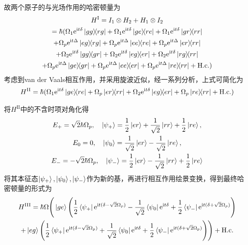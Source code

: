 \documentclass[fontset=windows,toc=true,type=bachelor,stage=opening,campus=weihai]{hithesisart}
\begin{document}
\begin{enumerate}
故两个原子的与光场作用的哈密顿量为
\begin{multline}
H^\mathrm{I}=I_1\otimes H_2+H_1\otimes I_2\\
=\hbar(\Omega_1\mathrm{e}^{\mathrm{i}t\delta}\ketbra{gg}{rg}
+\Omega_1\mathrm{e}^{\mathrm{i}t\delta}\ketbra{ge}{re}
+\Omega_1\mathrm{e}^{\mathrm{i}t\delta}\ketbra{gr}{rr}\\
+\Omega_p\mathrm{e}^{\mathrm{i}t\Delta}\ketbra{eg}{rg}
+\Omega_p\mathrm{e}^{\mathrm{i}t\Delta}\ketbra{ee}{re}
+\Omega_p\mathrm{e}^{\mathrm{i}t\Delta}\ketbra{er}{rr}\\
+\Omega_2\mathrm{e}^{\mathrm{i}t\delta}\ketbra{gg}{gr}
+\Omega_2\mathrm{e}^{\mathrm{i}t\delta}\ketbra{eg}{er}
+\Omega_2\mathrm{e}^{\mathrm{i}t\delta}\ketbra{rg}{rr}\\
+\Omega_p\mathrm{e}^{\mathrm{i}t\Delta}\ketbra{ge}{gr}
+\Omega_p\mathrm{e}^{\mathrm{i}t\Delta}\ketbra{ee}{er}
+\Omega_p\mathrm{e}^{\mathrm{i}t\Delta}\ketbra{re}{rr}
+\mathrm{H.c.})
\end{multline}
考虑到van der Vaals相互作用，并采用旋波近似，经一系列分析，上式可简化为
\begin{equation}
H^{\mathrm{II}}=\hbar(\Omega_1\mathrm{e}^{\mathrm{i}t \delta}\ketbra{ge}{re}
+\Omega_p\ketbra{er}{rr}
+\Omega_2\mathrm{e}^{\mathrm{i}t \delta}\ketbra{eg}{er}
+\Omega_p\ketbra{re}{rr}+\mathrm{H.c.})
\end{equation}


将$ H^{\mathrm{II}} $中的不含时项对角化得
\begin{equation}
\begin{gathered}
E_+=\sqrt{2}\hbar\Omega_p,\quad\ket{\psi_+}=\frac{1}{2}\ket{er}+\frac{1}{\sqrt{2}}\ket{rr}+\frac{1}{2}\ket{re},\\
E_0=0,\quad\ket{\psi_0}=\frac{1}{\sqrt{2}}\ket{er}-\frac{1}{\sqrt{2}}\ket{re},\\
E_-=-\sqrt{2}\hbar\Omega_p,\quad\ket{\psi_-}=\frac{1}{2}\ket{er}-\frac{1}{\sqrt{2}}\ket{rr}+\frac{1}{2}\ket{re}
\end{gathered}
\end{equation}
将其本征态$ \ket{\psi_+},\ket{\psi_0},\ket{\psi_-} $作为新的基，再进行相互作用绘景变换，得到最终哈密顿量的形式为
\begin{multline}\label{hiii}
H^{\mathrm{III}}=\hbar\Omega\Bigg(\ket{ge}\Bigg(\frac{1}{2}\bra{\psi_+}\mathrm{e}^{\mathrm{i}t(\delta-\sqrt{2}\Omega_p)}-\frac{1}{\sqrt{2}}\bra{\psi_0}\mathrm{e}^{\mathrm{i}t \delta}+\frac{1}{2}\bra{\psi_-}\mathrm{e}^{\mathrm{i}t (\delta+\sqrt{2}\Omega_p)}\Bigg)\\
+\ket{eg}\Bigg(\frac{1}{2}\bra{\psi_+}\mathrm{e}^{\mathrm{i}t(\delta-\sqrt{2}\Omega_p)}+\frac{1}{\sqrt{2}}\bra{\psi_0}\mathrm{e}^{\mathrm{i}t \delta}+\frac{1}{2}\bra{\psi_-}\mathrm{e}^{\mathrm{i}t (\delta+\sqrt{2}\Omega_p)}\Bigg)\Bigg)+\mathrm{H.c.}
\end{multline}


\end{enumerate}
\end{document}
